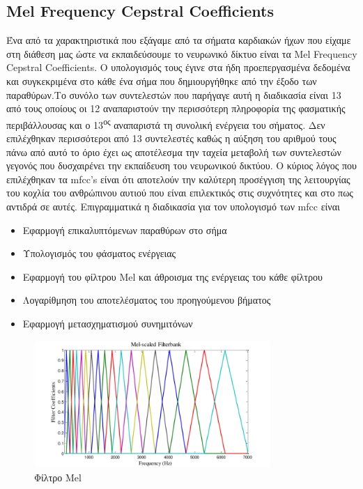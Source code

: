 \documentclass[../main.tex]{subfiles}
\begin{document}
\subsection{Mel Frequency Cepstral Coefficients}
Ένα από τα χαρακτηριστικά που εξάγαμε από τα σήματα καρδιακών ήχων που είχαμε
στη διάθεση μας ώστε να εκπαιδεύσουμε το νευρωνικό δίκτυο είναι τα Mel Frequency
Cepstral Coefficients. Ο υπολογισμός τους έγινε στα ήδη προεπεργασμένα δεδομένα
και συγκεκριμένα στο κάθε ένα σήμα που δημιουργήθηκε από την έξοδο των
παραθύρων.Το συνόλο των συντελεστών που παρήγαγε αυτή η διαδικασία είναι 13 από
τους οποίους οι 12 αναπαριστούν την περισσότερη πληροφορία της φασματικής
περιβάλλουσας και ο 13\textsuperscript{ος} αναπαριστά τη συνολική ενέργεια του
σήματος. Δεν επιλέχθηκαν περισσότεροι από 13 συντελεστές καθώς η αύξηση του
αριθμού τους πάνω από αυτό το όριο έχει ως αποτέλεσμα την ταχεία μεταβολή των
συντελεστών γεγονός που δυσχαιρένει την εκπαίδευση του νευρωνικού δικτύου. Ο
κύριος λόγος που επιλέχθηκαν τα mfcc's είναι ότι αποτελούν την καλύτερη
προσέγγιση της λειτουργίας του κοχλία του ανθρώπινου αυτιού που είναι
επιλεκτικός στις συχνότητες και στο πως αντιδρά σε αυτές. Επιγραμματικά η
διαδικασία για τον υπολογισμό των mfcc είναι \cite{mfcc}

\begin{itemize}
	\item Εφαρμογή επικαλυπτόμενων παραθύρων στο σήμα
	\item Υπολογισμός του φάσματος ενέργειας
	\item Εφαρμογή του φίλτρου Mel και άθροισμα της ενέργειας του κάθε φίλτρου
	\item Λογαρίθμηση του αποτελέσματος του προηγούμενου βήματος
	\item Εφαρμογή μετασχηματισμού συνημιτόνων
\end{itemize}

\begin{figure}[H]
	\center
	\includegraphics[width=0.8\textwidth]{images/MelFilter.png}
	\caption{Φίλτρο Mel}
	\label{melfilter}
\end{figure}
\end{document}
